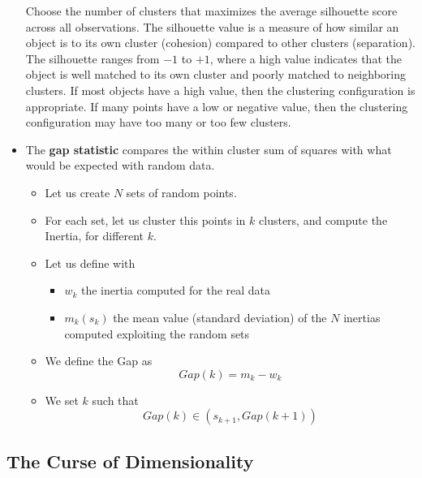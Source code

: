 \begin{itemize}
          Choose the number of clusters that maximizes the average silhouette score across all observations.
          The silhouette value is a measure of how similar an object is to its own cluster (cohesion) compared to other clusters (separation). The silhouette ranges from $-1$ to $+1$, where a high value indicates that the object is well matched to its own cluster and poorly matched to neighboring clusters. If most objects have a high value, then the clustering configuration is appropriate. If many points have a low or negative value, then the clustering configuration may have too many or too few clusters.
    \item The \textbf{gap statistic} compares the within cluster sum of squares with what would be expected with random data.
          \begin{itemize}
              \item Let us create $N$ sets of random points.
              \item For each set, let us cluster this points in $k$ clusters, and compute the Inertia, for different $k$.
              \item Let us define with
                    \begin{itemize}
                        \item $w_{k}$ the inertia computed for the real data
                        \item $m_{k}( s_{k})$ the mean value (standard deviation) of the $N$ inertias computed exploiting the random sets
                    \end{itemize}
              \item We define the Gap as
                    \begin{equation*}
                        Gap( k) =m_{k} -w_{k}
                    \end{equation*}
              \item We set $k$ such that
                    \begin{equation*}
                        Gap( k) \in ( s_{k+1} ,Gap( k+1))
                    \end{equation*}
          \end{itemize}
\end{itemize}

\subsection{The Curse of Dimensionality}

